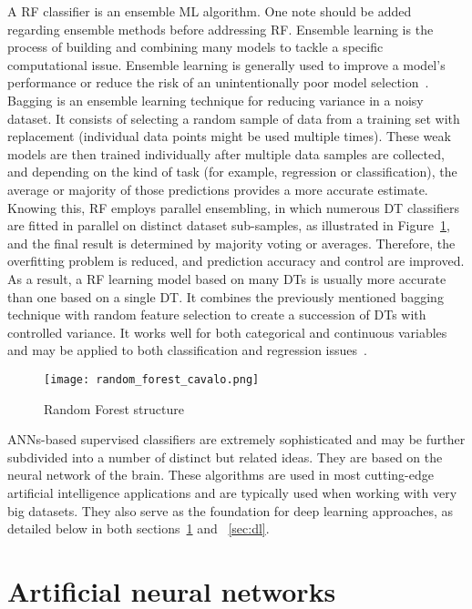 A \gls{RF} classifier is an ensemble \gls{ML} algorithm. One note should be added regarding ensemble methods before addressing \gls{RF}. Ensemble learning is the process of building and combining many models to tackle a specific computational issue. Ensemble learning is generally used to improve a model's performance or reduce the risk of an unintentionally poor model selection~\cite{Mahesh2019MachineReview}. Bagging is an ensemble learning technique for reducing variance in a noisy dataset. It consists of selecting a random sample of data from a training set with replacement (individual data points might be used multiple times). These weak models are then trained individually after multiple data samples are collected, and depending on the kind of task (for example, regression or classification), the average or majority of those predictions provides a more accurate estimate. Knowing this, \gls{RF} employs parallel ensembling, in which numerous \gls{DT} classifiers are fitted in parallel on distinct dataset sub-samples, as illustrated in Figure~\ref{fig:random_forest2}, and the final result is determined by majority voting or averages. Therefore, the overfitting problem is reduced, and prediction accuracy and control are improved. As a result, a \gls{RF} learning model based on many \gls{DT}s is usually more accurate than one based on a single \gls{DT}. It combines the previously mentioned bagging technique with random feature selection to create a succession of \gls{DT}s with controlled variance. It works well for both categorical and continuous variables and may be applied to both classification and regression issues~\cite{Sarker2021MachineDirections}.

\begin{figure}[htbp]
    \centering
    \texttt{[image: random\_forest\_cavalo.png]}
    \caption{Random Forest structure~\cite{Sarker2021MachineDirections}}
    \label{fig:random_forest2}
\end{figure}

\gls{ANN}s-based supervised classifiers are extremely sophisticated and may be further subdivided into a number of distinct but related ideas. They are based on the neural network of the brain. These algorithms are used in most cutting-edge artificial intelligence applications and are typically used when working with very big datasets. They also serve as the foundation for deep learning approaches, as detailed below in both sections~\ref{sec:ann} and ~\ref{sec:dl}.

\section{Artificial neural networks}\label{sec:ann}

